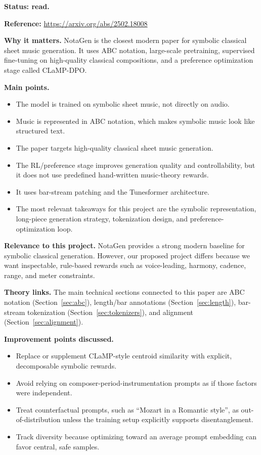 \documentclass[11pt]{article}
\begin{document}
\textbf{Status: read.}

\textbf{Reference:}
\url{https://arxiv.org/abs/2502.18008}

\textbf{Why it matters.}
NotaGen is the closest modern paper for symbolic classical sheet music
generation. It uses ABC notation, large-scale pretraining, supervised
fine-tuning on high-quality classical compositions, and a preference
optimization stage called CLaMP-DPO.

\textbf{Main points.}
\begin{itemize}[leftmargin=*]
  \item The model is trained on symbolic sheet music, not directly on audio.
  \item Music is represented in ABC notation, which makes symbolic music look
  like structured text.
  \item The paper targets high-quality classical sheet music generation.
  \item The RL/preference stage improves generation quality and controllability,
  but it does not use predefined hand-written music-theory rewards.
  \item It uses bar-stream patching and the Tunesformer architecture.
  \item The most relevant takeaways for this project are the symbolic
  representation, long-piece generation strategy, tokenization design, and
  preference-optimization loop.
\end{itemize}

\textbf{Relevance to this project.}
NotaGen provides a strong modern baseline for symbolic classical generation.
However, our proposed project differs because we want inspectable, rule-based
rewards such as voice-leading, harmony, cadence, range, and meter constraints.

\textbf{Theory links.}
The main technical sections connected to this paper are ABC notation
(Section~\ref{sec:abc}), length/bar annotations (Section~\ref{sec:length}),
bar-stream tokenization (Section~\ref{sec:tokenizers}), and alignment
(Section~\ref{sec:alignment}).

\textbf{Improvement points discussed.}
\begin{itemize}[leftmargin=*]
  \item Replace or supplement CLaMP-style centroid similarity with explicit,
  decomposable symbolic rewards.
  \item Avoid relying on composer-period-instrumentation prompts as if those
  factors were independent.
  \item Treat counterfactual prompts, such as ``Mozart in a Romantic style'', as
  out-of-distribution unless the training setup explicitly supports
  disentanglement.
  \item Track diversity because optimizing toward an average prompt embedding
  can favor central, safe samples.
\end{itemize}
\end{document}
